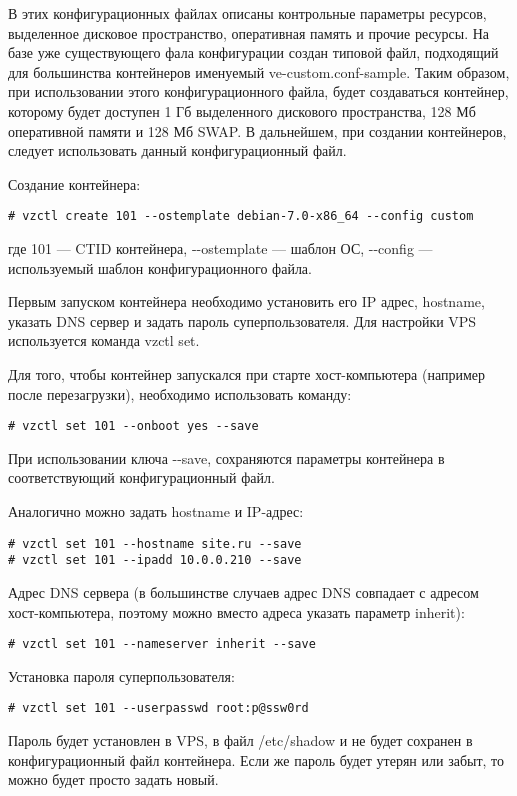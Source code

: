 В этих конфигурационных файлах описаны контрольные параметры ресурсов, выделенное дисковое пространство, оперативная память и прочие ресурсы.
На базе уже существующего фала конфигурации создан типовой файл, подходящий для большинства контейнеров именуемый ve-custom.conf-sample.
Таким образом, при использовании этого конфигурационного файла, будет создаваться контейнер, которому будет доступен 1 Гб выделенного дискового пространства, 128 Мб оперативной памяти и 128 Мб SWAP.
В дальнейшем, при создании контейнеров, следует использовать данный конфигурационный файл.

Создание контейнера:
\begin{lstlisting}
# vzctl create 101 --ostemplate debian-7.0-x86_64 --config custom
\end{lstlisting}
где 101 --- CTID контейнера, -{}-ostemplate --- шаблон ОС, -{}-config --- используемый шаблон конфигурационного файла.

Первым запуском контейнера необходимо установить его IP адрес, hostname, указать DNS сервер и задать пароль суперпользователя.
Для настройки VPS используется команда vzctl set.

Для того, чтобы контейнер запускался при старте хост-компьютера (например после перезагрузки), необходимо использовать команду:
\begin{lstlisting}
# vzctl set 101 --onboot yes --save
\end{lstlisting}

При использовании ключа -{}-save, сохраняются параметры контейнера в соответствующий конфигурационный файл.

Аналогично можно задать hostname и IP-адрес:
\begin{lstlisting}
# vzctl set 101 --hostname site.ru --save
# vzctl set 101 --ipadd 10.0.0.210 --save
\end{lstlisting}

Адрес DNS сервера (в большинстве случаев адрес DNS совпадает с адресом хост-компьютера, поэтому можно вместо адреса указать параметр inherit):
\begin{lstlisting}
# vzctl set 101 --nameserver inherit --save
\end{lstlisting}

Установка пароля суперпользователя:
\begin{lstlisting}
# vzctl set 101 --userpasswd root:p@ssw0rd
\end{lstlisting}

Пароль будет установлен в VPS, в файл /etc/shadow и не будет сохранен в конфигурационный файл контейнера.
Если же пароль будет утерян или забыт, то можно будет просто задать новый.

